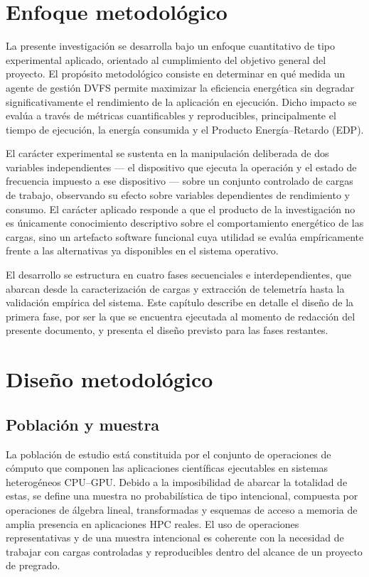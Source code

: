 \documentclass[12pt,oneside,spanish]{book}
\begin{document}
\section{Enfoque metodológico}

La presente investigación se desarrolla bajo un enfoque cuantitativo de tipo experimental aplicado, orientado al cumplimiento del objetivo general del proyecto. El propósito metodológico consiste en determinar en qué medida un agente de gestión DVFS permite maximizar la eficiencia energética sin degradar significativamente el rendimiento de la aplicación en ejecución. Dicho impacto se evalúa a través de métricas cuantificables y reproducibles, principalmente el tiempo de ejecución, la energía consumida y el Producto Energía--Retardo (EDP).

El carácter experimental se sustenta en la manipulación deliberada de dos variables independientes --- el dispositivo que ejecuta la operación y el estado de frecuencia impuesto a ese dispositivo --- sobre un conjunto controlado de cargas de trabajo, observando su efecto sobre variables dependientes de rendimiento y consumo. El carácter aplicado responde a que el producto de la investigación no es únicamente conocimiento descriptivo sobre el comportamiento energético de las cargas, sino un artefacto software funcional cuya utilidad se evalúa empíricamente frente a las alternativas ya disponibles en el sistema operativo.

El desarrollo se estructura en cuatro fases secuenciales e interdependientes, que abarcan desde la caracterización de cargas y extracción de telemetría hasta la validación empírica del sistema. Este capítulo describe en detalle el diseño de la primera fase, por ser la que se encuentra ejecutada al momento de redacción del presente documento, y presenta el diseño previsto para las fases restantes.

\section{Diseño metodológico}

\subsection{Población y muestra}

La población de estudio está constituida por el conjunto de operaciones de cómputo que componen las aplicaciones científicas ejecutables en sistemas heterogéneos CPU--GPU. Debido a la imposibilidad de abarcar la totalidad de estas, se define una muestra no probabilística de tipo intencional, compuesta por operaciones de álgebra lineal, transformadas y esquemas de acceso a memoria de amplia presencia en aplicaciones HPC reales. El uso de operaciones representativas y de una muestra intencional es coherente con la necesidad de trabajar con cargas controladas y reproducibles dentro del alcance de un proyecto de pregrado.
\end{document}

